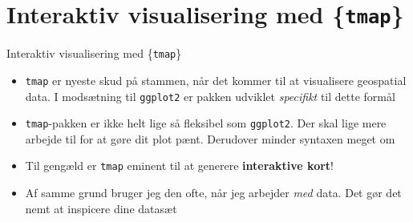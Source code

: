 \documentclass[
  8pt,
  ignorenonframetext,
  aspectratio=169]{beamer}
\newcommand{\columnsend}{\end{columns}}
\begin{document}

\hypertarget{interaktiv-visualisering-med-tmap}{%
\section{\texorpdfstring{Interaktiv visualisering med
\{\texttt{tmap}\}}{Interaktiv visualisering med \{tmap\}}}\label{interaktiv-visualisering-med-tmap}}

\begin{frame}[fragile]{Interaktiv visualisering med \{\texttt{tmap}\}}
\protect\hypertarget{interaktiv-visualisering-med-tmap-1}{}
\begin{itemize}
\item
  \texttt{tmap} er nyeste skud på stammen, når det kommer til at
  visualisere geospatial data. I modsætning til \texttt{ggplot2} er
  pakken udviklet \emph{specifikt} til dette formål
\item
  \texttt{tmap}-pakken er ikke helt lige så fleksibel som
  \texttt{ggplot2}. Der skal lige mere arbejde til for at gøre dit plot
  pænt. Derudover minder syntaxen meget om
\item
  Til gengæld er \texttt{tmap} eminent til at generere
  \textbf{interaktive kort}!
\item
  Af samme grund bruger jeg den ofte, når jeg arbejder \emph{med} data.
  Det gør det nemt at inspicere dine datasæt
\end{itemize}
\end{frame}
\end{document}
